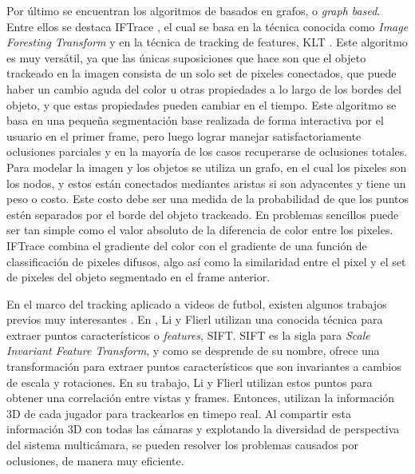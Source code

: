 \documentclass[twocolumn,a4paper,10pt]{article}
\begin{document}
Por último se encuentran los algoritmos de basados en grafos, o \textit{graph based}. Entre ellos se destaca IFTrace \cite{IFTrace}, el cual se basa en la técnica conocida como 
\textit{Image Foresting Transform} \cite{IFT} y en la técnica de tracking de features, KLT \cite{KLT}. Este algoritmo es muy versátil, ya que las únicas suposiciones que hace son que el objeto trackeado en la imagen consista de un
solo set de pixeles conectados, que puede haber un cambio aguda del color u otras propiedades a lo largo de los bordes del objeto, y que estas propiedades pueden cambiar en el 
tiempo. Este algoritmo se basa en una pequeña segmentación base realizada de forma interactiva por el usuario en el primer frame, pero luego lograr manejar satisfactoriamente
oclusiones parciales y en la mayoría de los casos recuperarse de oclusiones totales. Para modelar la imagen y los objetos se utiliza un grafo, en el cual los pixeles son los nodos, y
estos están conectados mediantes aristas si son adyacentes y tiene un peso o costo. Este costo debe ser una medida de la probabilidad de que los puntos estén separados por el borde del
objeto trackeado. En problemas sencillos puede ser tan simple como el valor absoluto de la diferencia de color entre los pixeles. IFTrace combina el gradiente del color con el 
gradiente de una función de classificación de pixeles difusos, algo así como la similaridad entre el pixel y el set de pixeles del objeto segmentado en el frame anterior.

En el marco del tracking aplicado a videos de futbol, existen algunos trabajos previos muy interesantes \cite{paper-suecia-soccer} \cite{papers-tanos}. En \cite{paper-suecia-soccer},
Li y Flierl utilizan una conocida técnica para extraer puntos característicos o \textit{features}, SIFT. SIFT es la sigla para \textit{Scale Invariant Feature Transform}, y como se 
desprende de su nombre, ofrece una transformación para extraer puntos característicos que son invariantes a cambios de escala y rotaciones. En su trabajo, Li y Flierl utilizan estos 
puntos para obtener una correlación entre vistas y frames. Entonces, utilizan la información 3D de cada jugador para trackearlos en timepo real. Al compartir esta información 3D con
todas las cámaras y explotando la diversidad de perspectiva del sistema multicámara, se pueden resolver los problemas causados por oclusiones, de manera muy eficiente.

\end{document}
